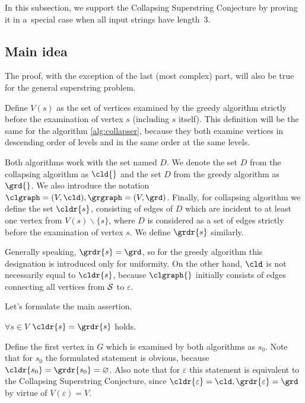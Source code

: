 In this subsection, we support the Collapsing Superstring Conjecture by proving it in a~special case when all input strings have length~3.

\subsection{Main idea}

The proof, with the exception of the last (most complex) part, will also be true for the general superstring problem.

Define $V(s)$ as the set of vertices examined by the greedy algorithm strictly before the examination of vertex $s$ (including $s$ itself). This definition will be the same for the algorithm \ref{alg:collapser}, because they both examine vertices in descending order of levels and in the same order at the same levels.

Both algorithms work with the set named $D$. We denote the set $D$ from the collapsing algorithm as $\cld{}$ and the set $D$ from the greedy algorithm as $\grd{}$. We also introduce the notation $\clgraph = (V, \cld), \grgraph = (V, \grd)$. Finally, for collapsing algorithm we define the set $\cldr{s}$, consisting of edges of $D$ which are incident to at least one vertex from $ V (s) \backslash \{s \} $, where $D$ is considered as a set of edges strictly before the examination of vertex $s$. We define $\grdr{s}$ similarly.

\begin{remark}
Generally speaking, $\grdr{s}=\grd$, so for the greedy algorithm this designation is introduced only for uniformity. On the other hand, $\cld$ is not necessarily equal to $\cldr{s}$, because $\clgraph{}$ initially consists of edges connecting all vertices from $ {\cal S} $ to $ \varepsilon $.
\end{remark}

Let's formulate the main assertion.

\begin{statement}
    $\forall s \in V$ $\cldr{s}=\grdr{s}$ holds.
\end{statement}

Define the first vertex in $G$ which is examined by both algorithms as $s_0$. Note that for $s_0$ the formulated statement is obvious, because $\cldr{s_0} = \grdr{s_0} = \varnothing $. Also note that for $\varepsilon $ this statement is equivalent to the Collapsing Superstring Conjecture, since $\cldr{\varepsilon}=\cld, \grdr{\varepsilon}=\grd $ by virtue of $ V (\varepsilon) = V $.

